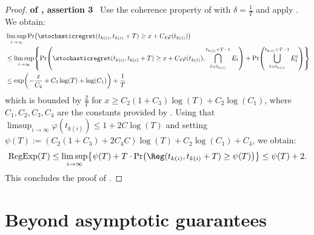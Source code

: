 \documentclass[preprint,cleveref,12pt]{colt2025}
\DeclarePairedDelimiter{\braces}{\{}{\}}	%
\DeclarePairedDelimiter{\parens}{(}{)}	%
\DeclareMathOperator{\RegExp}{\mathrm{RegExp}}
\newcommand{\strong}[1]{\textbf{#1}}
\begin{document}
    \begin{proof}\hspace{-0.2em}\strong{ of , assertion 3}~
        Use the coherence property of  with $\delta = \frac 1T$ and apply .
        We obtain:
        \begin{align*}
            & \limsup_{i \to \infty}
            \Pr \parens*{
                \stochasticregret(t_{k(i)}, t_{k(i)}+T)
                \ge 
                x + C_4 \varphi(t_{k(i)})
            }
            \\
            & \le
            \limsup_{i \to \infty}
            \braces*{
                \Pr \parens*{
                    \stochasticregret(t_{k(i)}, t_{k(i)}+T)
                    \ge 
                    x + C_4 \varphi(t_{k(i)})
                    ,
                    \bigcap_{t=t_{k(i)}}^{t_{k(i)}+T-1}
                    E_t
                }
                +
                \Pr \parens*{
                    \bigcup_{t=t_{k(i)}}^{t_{k(i)}+T-1}
                    E_t^c
                }
            }
            \\
            & \le
            \exp\parens*{
                - \frac x{C_2} + C_3 \log(T) + \log(C_1)
            }
            + \frac 1T
        \end{align*}
        which is bounded by $\frac 2T$ for $x \ge C_2 (1+C_3) \log(T) + C_2 \log(C_1)$, where $C_1, C_2, C_3, C_4$ are the constants provided by . 
        Using that $\limsup_{i \to \infty} \varphi(t_{k(i)}) \le 1 + 2C \log(T)$ and setting $\psi(T) := (C_2 (1 + C_3) + 2 C_4 C)\log(T) + C_2 \log (C_1) + C_4$, we obtain:
        \begin{equation}
            \RegExp(T)
            \le
            \limsup_{i \to \infty} 
            \braces*{
                \psi(T)
                + 
                T 
                \cdot
                \Pr \parens*{
                    \Reg(t_{k(i)}, t_{k(i)}+T)
                    \ge 
                    \psi(T)
                }
            }
            \le
            \psi(T) + 2.
        \end{equation}
        This concludes the proof of .
    \end{proof}

    \section{Beyond asymptotic guarantees}
\end{document}

